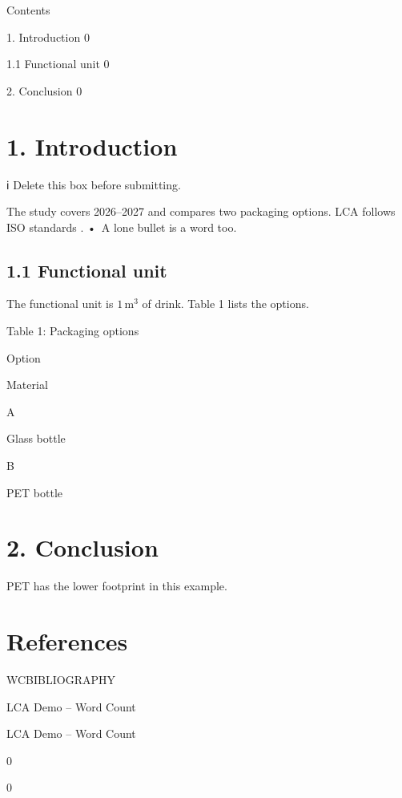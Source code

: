 


\begin{wctoc}
Contents

1. Introduction 0

1.1 Functional unit 0

2. Conclusion 0


\end{wctoc}


\section*{1. Introduction}

\begin{wcguidance}ℹ Delete this box before submitting.\end{wcguidance}

The study covers 2026--2027 and compares two packaging options.
LCA follows ISO standards \cite{debruijnHandbookLifeCycle2002a}.
•\ A lone bullet is a word too.



\subsection*{1.1 Functional unit}

The functional unit is $1\,\mathrm{m^3}$ of drink.
Table 1 lists the options.

\begin{table}[h]
    
\begin{wccaption}
Table 1: Packaging options
\end{wccaption}

  
    \begin{wctable}
Option

Material

A

Glass bottle

B

PET bottle

\end{wctable}

\end{table}

\section*{2. Conclusion}

PET has the lower footprint in this example.

\section*{References}
\begin{wcbibliography}
WCBIBLIOGRAPHY
\end{wcbibliography}


\begin{wcheader}
LCA Demo -- Word Count
\end{wcheader}
\begin{wcheader}
LCA Demo -- Word Count
\end{wcheader}
\begin{wcheader}
0
\end{wcheader}
\begin{wcheader}
0
\end{wcheader}


